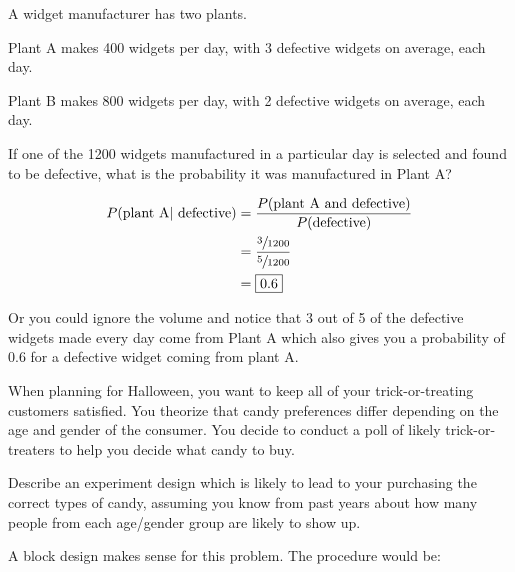 \documentclass[landscape]{exam}
\begin{document}
\begin{questions}
    \question[5] A widget manufacturer has two plants. 
    
    \begin{itemize*}
      \item Plant A makes 400 widgets per day, with 3 defective widgets on
        average, each day.
      \item Plant B makes 800 widgets per day, with 2 defective widgets on
        average, each day.
    \end{itemize*}

    If one of the 1200 widgets manufactured in a particular day is selected and
    found to be defective, what is the probability it was manufactured in Plant
    A\@?

    \begin{solution}
      \begin{align*}
        P(\text{plant A} | \text{ defective}) & = \frac{P(\text{plant A and defective})}{P(\text{defective})} \\
                                              & = \frac{ \sfrac{3}{1200} }{ \sfrac{5}{1200} } \\
                                              & = \boxed{ 0.6 } \\
      \end{align*}

      Or you could ignore the volume and notice that 3 out of 5 of the defective
      widgets made every day come from Plant A which also gives you a
      probability of 0.6 for a defective widget coming from plant A.
    \end{solution}

    \ifprintanswers{}
    \else
      \newpage
    \fi

    \question[5]
      When planning for Halloween, you want to keep all of your
      trick-or-treating customers satisfied. You theorize that candy preferences
      differ depending on the age and gender of the consumer.  You decide to
      conduct a poll of likely trick-or-treaters to help you decide what candy
      to buy. 
      
      Describe an experiment design which is likely to lead to your purchasing
      the correct types of candy, assuming you know from past years about how
      many people from each age/gender group are likely to show up. 

      \begin{solution}
        A block design makes sense for this problem. The procedure would be:


\end{solution}
\end{questions}
\end{document}
